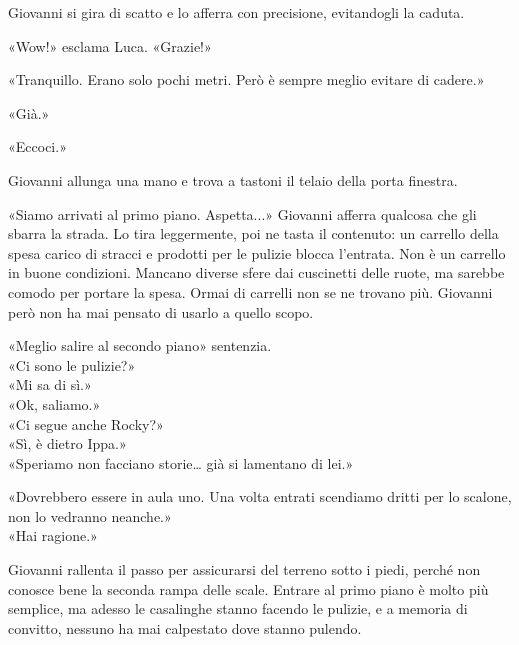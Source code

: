 \documentclass[10pt,oneside]{extbook}
\begin{document}
\par\medskip
Giovanni si gira di scatto e lo afferra con precisione, evitandogli la caduta.

\par\medskip
«Wow!» esclama Luca. «Grazie!»

\par\medskip
«Tranquillo. Erano solo pochi metri. Però \`e sempre meglio evitare di cadere.»

\par\medskip
«Già.»

\par\medskip
«Eccoci.»

\par\medskip
Giovanni allunga una mano e trova a tastoni il telaio della porta finestra.

\par\medskip
«Siamo arrivati al primo piano. Aspetta...» Giovanni afferra qualcosa che gli sbarra la strada. Lo tira leggermente, poi ne tasta il contenuto: un carrello della spesa carico di stracci e prodotti per le pulizie blocca l’entrata.
Non \`e un carrello in buone condizioni. Mancano diverse sfere dai cuscinetti delle ruote, ma sarebbe comodo per portare la spesa. Ormai di carrelli non se ne trovano pi\`u. Giovanni per\`o non ha mai pensato di usarlo a quello scopo.

\par\medskip
«Meglio salire al secondo piano» sentenzia.\\
«Ci sono le pulizie?»\\
«Mi sa di sì.»\\
«Ok, saliamo.»\\
«Ci segue anche Rocky?»\\
«Sì, \`e dietro Ippa.»\\
«Speriamo non facciano storie… gi\`a si lamentano di lei.»

\par\medskip
«Dovrebbero essere in aula uno. Una volta entrati scendiamo dritti per lo scalone, non lo vedranno neanche.»\\
«Hai ragione.»

\par\medskip
Giovanni rallenta il passo per assicurarsi del terreno sotto i piedi, perch\'e non conosce bene la seconda rampa delle scale. Entrare al primo piano \`e molto pi\`u semplice, ma adesso le casalinghe stanno facendo le pulizie, e a memoria di convitto, nessuno ha mai calpestato dove  stanno pulendo.
\end{document}
